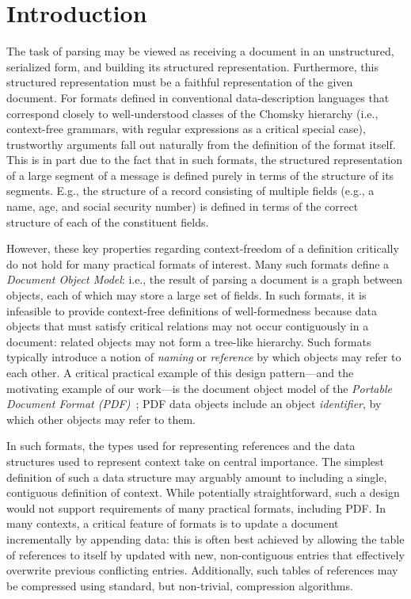 \section{Introduction }
\label{sec:intro}
The task of parsing may be viewed as receiving a document in an
unstructured, serialized form, and building its structured
representation. Furthermore, this structured representation must be a 
faithful representation of the given document.
%
For formats defined in conventional data-description languages that
correspond closely to well-understood classes of the Chomsky hierarchy
(i.e., context-free grammars, with regular expressions as a critical
special case), trustworthy arguments fall out naturally from the
definition of the format itself.
%
This is in part due to the fact that in such formats, the structured
representation of a large segment of a message is defined purely in
terms of the structure of its segments.
%
E.g., the structure of a record consisting of multiple fields (e.g., a
name, age, and social security number) is defined in terms of the
correct structure of each of the constituent fields.

However, these key properties regarding context-freedom of a
definition critically do not hold for many practical formats of
interest.
%
Many such formats define a \emph{Document Object Model}: i.e., the
result of parsing a document is a graph between objects, each
of which may store a large set of fields.
%
In such formats, it is infeasible to provide context-free definitions
of well-formedness because data objects that must satisfy critical
relations may not occur contiguously in a document: related objects
may not form a tree-like hierarchy.
%
Such formats typically introduce a notion of \emph{naming} or
\emph{reference} by which objects may refer to each other.
%
A critical practical example of this design pattern---and the
motivating example of our work---is the document object model of the
\emph{Portable Document Format (PDF)}~\cite{isotc171sc2wg8ISO32000220202020};
%
PDF data objects include an object \emph{identifier}, by which other
objects may refer to them.

In such formats, the types used for representing references and the
data structures used to represent context take on central importance.
%
The simplest definition of such a data structure may arguably amount
to including a single, contiguous definition of context.
%
While potentially straightforward, such a design would not support
requirements of many practical formats, including PDF.
%
In many contexts, a critical feature of formats is to update a
document incrementally by appending data: this is often best achieved
by allowing the table of references to itself by updated with new,
non-contiguous entries that effectively overwrite previous conflicting
entries.
%
Additionally, such tables of references may be compressed using
standard, but non-trivial, compression algorithms.

